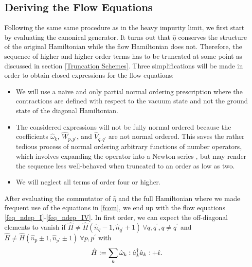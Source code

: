 \subsection{Deriving the Flow Equations}
Following the same same procedure as in the heavy impurity limit, we first start by evaluating the canonical generator. It turns out that $\hat\eta$ conserves the structure of the original Hamiltonian while the flow Hamiltonian does not. Therefore, the sequence of higher and higher order terms has to be truncated at some point as discussed in section \ref{Truncation Schemes}. 
Three simplifications will be made in order to obtain closed expressions for the flow equations:
\begin{itemize}
\item We will use a na\"ive and only partial normal ordering prescription where the contractions are defined with respect to the vacuum state and not the ground state of the diagonal Hamiltonian.
\item The considered expressions will not be fully normal ordered because the coefficients $\hat\omega_k $, $\hat W_{p,p^\prime}$, and $\hat V_{q,q^\prime}$ are not normal ordered. This saves the rather tedious process of normal ordering arbitrary functions of number operators, which involves expanding the operator into a Newton series \cite{10.21468/SciPostPhys.10.1.007}, but may render the sequence less well-behaved when truncated to an order as low as two.
\item  We will neglect all terms of order four or higher.
\end{itemize}
After evaluating the commutator of $\hat\eta$ and the full Hamiltonian where we made frequent use of the equations in \ref{fcom}, we end up with the flow equations \ref{feq_ndep_I}-\ref{feq_ndep_IV}. In first order, we can expect the off-diagonal elements to vanish if $\hat H \neq \hat H(\hat n_q-1,\hat n_{q^\prime}+1)\ \forall q,q^\prime,q\neq q^\prime$ and $\hat H \neq \hat H(\hat n_p\pm 1,\hat n_{p^\prime}\pm 1)\ \forall p,p^\prime$ with \begin{equation}\hat H\vcentcolon= \sum\limits_k \hat\omega_k \vcentcolon\hat a^\dagger_k\hat a_k\vcentcolon+\hat\epsilon. \end{equation}



